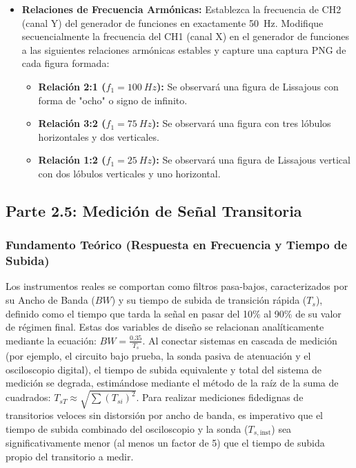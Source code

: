 \documentclass[12pt, letterpaper]{article}
\begin{document}
\begin{itemize}
    \item \textbf{Relaciones de Frecuencia Armónicas:} Establezca la frecuencia de CH2 (canal Y) del generador de funciones en exactamente \SI{50}{Hz}. Modifique secuencialmente la frecuencia del CH1 (canal X) en el generador de funciones a las siguientes relaciones armónicas estables y capture una captura PNG de cada figura formada:
    \begin{itemize}
        \item \textbf{Relación 2:1 ($f_1 = \SI{100}{Hz}$):} Se observará una figura de Lissajous con forma de "ocho" o signo de infinito.
        \item \textbf{Relación 3:2 ($f_1 = \SI{75}{Hz}$):} Se observará una figura con tres lóbulos horizontales y dos verticales.
        \item \textbf{Relación 1:2 ($f_1 = \SI{25}{Hz}$):} Se observará una figura de Lissajous vertical con dos lóbulos verticales y uno horizontal.
    \end{itemize}
\end{itemize}

\subsection{Parte 2.5: Medición de Señal Transitoria}

\subsubsection*{Fundamento Teórico (Respuesta en Frecuencia y Tiempo de Subida)}
Los instrumentos reales se comportan como filtros pasa-bajos, caracterizados por su Ancho de Banda ($BW$) y su tiempo de subida de transición rápida ($T_s$), definido como el tiempo que tarda la señal en pasar del 10\% al 90\% de su valor de régimen final. Estas dos variables de diseño se relacionan analíticamente mediante la ecuación: $BW = \frac{0.35}{T_s}$. 
Al conectar sistemas en cascada de medición (por ejemplo, el circuito bajo prueba, la sonda pasiva de atenuación y el osciloscopio digital), el tiempo de subida equivalente y total del sistema de medición se degrada, estimándose mediante el método de la raíz de la suma de cuadrados: $T_{sT} \approx \sqrt{\sum (T_{si})^2}$. Para realizar mediciones fidedignas de transitorios veloces sin distorsión por ancho de banda, es imperativo que el tiempo de subida combinado del osciloscopio y la sonda ($T_{s,\text{inst}}$) sea significativamente menor (al menos un factor de 5) que el tiempo de subida propio del transitorio a medir.
\end{document}
